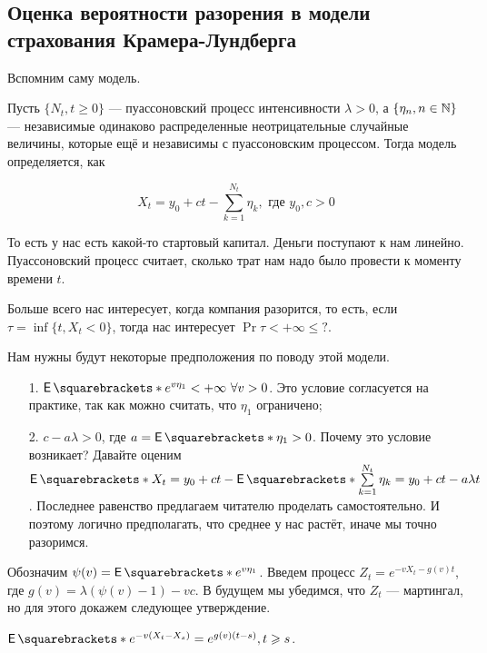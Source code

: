 \subsection{Оценка вероятности разорения в модели страхования Крамера-Лундберга}

Вспомним саму модель.

Пусть $\{N_t, t \geq 0\}$ --- пуассоновский процесс интенсивности $\lambda > 0$,
а $\{\eta_n, n \in \mathbb{N}\}$ --- независимые одинаково распределенные неотрицательные
случайные величины, которые ещё и независимы с пуассоновским процессом. Тогда
модель определяется, как

\[
  X_t = y_0 + ct - \sum\limits_{k = 1}^{N_t} \eta_k, \text{ где $y_0, c > 0$}
\]

То есть у нас есть какой-то стартовый капитал. Деньги поступают к нам линейно.
Пуассоновский процесс считает, сколько трат нам надо было провести к моменту
времени $t$.

Больше всего нас интересует, когда компания разорится, то есть, если 
$\tau = \inf\{t, X_t < 0\}$, тогда нас интересует $\Pr{\tau < +\infty} \leq ?$.

Нам нужны будут некоторые предположения по поводу этой модели.

\begin{itemize}
  \item[1.] $\E{e^{v\eta_1}} < +\infty \ \forall v > 0$. Это условие согласуется
  на практике, так как можно считать, что $\eta_1$ ограничено;
  \item[2.] $c - a\lambda > 0$, где $a = \E{\eta_1} > 0$. Почему это условие 
  возникает? Давайте оценим $\E{X_t} = y_0 + ct - \E{\sum\limits_{k = 1}^{N_t} 
  \eta_k} = y_0 + ct - a\lambda t$. Последнее равенство предлагаем читателю проделать
  самостоятельно. И поэтому логично предполагать, что среднее у нас растёт, иначе
  мы точно разоримся.
\end{itemize}

Обозначим $\psi(v) = \E{e^{v\eta_1}}$. Введем процесс $Z_t = e^{-vX_t - g(v)t}$,
где $g(v) = \lambda(\psi(v) - 1) - vc$. В будущем мы убедимся, что $Z_t$ --- 
мартингал, но для этого докажем следующее утверждение.

\begin{lemma}
  $\E{e^{-v(X_t - X_s)}} = e^{g(v)(t - s)}, t \geq s$.
\end{lemma}

